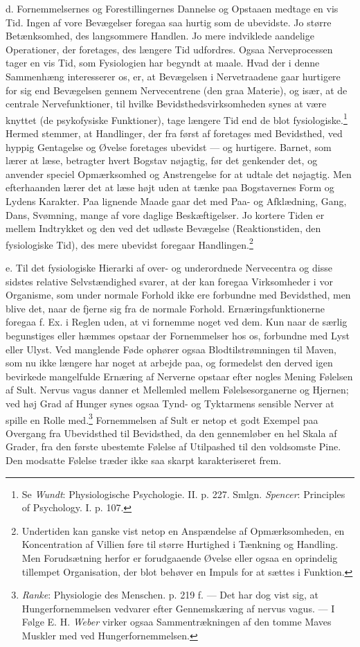 \documentclass[12pt,a4paper,openany]{book}
\newcommand{\opage}[1]{\marginnote{\footnotesize\textit{[#1]}}}
\begin{document}
d. Fornemmelsernes og Forestillingernes Dannelse og Opstaaen medtage en
vis Tid. Ingen af vore Bevægelser foregaa saa hurtig som de ubevidste.
Jo større Betænksomhed, des langsommere Handlen. Jo mere indviklede
aandelige Operationer, der foretages, des længere Tid udfordres. Ogsaa
Nerveprocessen tager en vis Tid, som Fysiologien har begyndt at maale.
Hvad der i denne Sammenhæng interesserer os, er, at Bevægelsen i
Nervetraadene gaar hurtigere for sig end Bevægelsen gennem Nervecentrene
(den graa Materie), og især, at de centrale Nervefunktioner, til hvilke
Bevidsthedsvirksomheden synes at være knyttet (de psykofysiske
Funktioner), tage længere Tid end de blot fysiologiske.\footnote[1]{Se
\emph{Wundt}: Physiologische Psychologie. II. p. 227. Smlgn.
\emph{Spencer}: Principles of Psychology. I. p. 107.} Hermed stemmer, at
Handlinger, der fra først af foretages med Bevidsthed, ved hyppig
Gentagelse og Øvelse foretages ubevidst --- og hurtigere. Barnet, som
lærer at læse, betragter hvert Bogstav nøjagtig, før det genkender det,
og anvender speciel Opmærksomhed og Anstrengelse for at udtale det
nøjagtig. Men efterhaanden lærer det at læse højt uden at tænke paa
Bogstavernes Form og Lydens Karakter. Paa lignende Maade gaar det med
Paa- og Afklædning, Gang, Dans, Svømning, mange af vore daglige
Beskæftigelser. Jo kortere Tiden er mellem Indtrykket og den ved det
udløste Bevægelse (Reaktionstiden, den fysiologiske Tid), des mere
ubevidst foregaar Handlingen.\footnote[2]{Undertiden kan ganske vist
netop en Anspændelse af Opmærksomheden, en Koncentration af Villien føre
til større Hurtighed i Tænkning og Handling. Men Forudsætning herfor er
forudgaaende Øvelse eller ogsaa en oprindelig tillempet Organisation,
der blot behøver en Impuls for at sættes i Funktion.}

e. Til det fysiologiske Hierarki af over- og underordnede Nervecentra og
disse sidstes relative Selvstændighed svarer, at der kan foregaa
Virksomheder i vor Organisme, som under normale Forhold ikke ere
forbundne med Bevidsthed, men blive det, naar de fjerne sig fra de
normale Forhold. Ernæringsfunktionerne foregaa f. Ex. i Reglen uden, at
vi fornemme
\opage{63}noget ved dem. Kun naar de særlig begunstiges eller hæmmes
opstaar der Fornemmelser hos os, forbundne med Lyst eller Ulyst. Ved
manglende Føde ophører ogsaa Blodtilstrømningen til Maven, som nu ikke
længere har noget at arbejde paa, og formedelst den derved igen
bevirkede mangelfulde Ernæring af Nerverne opstaar efter nogles Mening
Følelsen af Sult. Nervus vagus danner et Mellemled mellem
Følelsesorganerne og Hjernen; ved høj Grad af Hunger synes ogsaa Tynd-
og Tyktarmens sensible Nerver at spille en Rolle
med.\footnote[1]{\emph{Ranke}: Physiologie des Menschen. p. 219 f. ---
Det har dog vist sig, at Hungerfornemmelsen vedvarer efter Gennemskæring
af nervus vagus. --- I Følge E. H. \emph{Weber} virker ogsaa
Sammentrækningen af den tomme Maves Muskler med ved Hungerfornemmelsen.}
Fornemmelsen af Sult er netop et godt Exempel paa Overgang fra
Ubevidsthed til Bevidsthed, da den gennemløber en hel Skala af Grader,
fra den første ubestemte Følelse af Utilpashed til den voldsomste Pine.
Den modsatte Følelse træder ikke saa skarpt karakteriseret frem.
\end{document}
